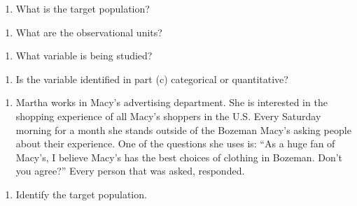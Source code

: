 \documentclass[
]{report}
\providecommand{\tightlist}{%
  \setlength{\itemsep}{0pt}\setlength{\parskip}{0pt}}
\begin{document}
\begin{enumerate}
\def\labelenumi{\alph{enumi}.}
\tightlist
\item
  What is the target population?
\end{enumerate}

\vspace{0.4in}

\begin{enumerate}
\def\labelenumi{\alph{enumi}.}
\setcounter{enumi}{1}
\tightlist
\item
  What are the observational units?
\end{enumerate}

\vspace{0.4in}

\begin{enumerate}
\def\labelenumi{\alph{enumi}.}
\setcounter{enumi}{2}
\tightlist
\item
  What variable is being studied?
\end{enumerate}

\vspace{0.4in}

\begin{enumerate}
\def\labelenumi{\alph{enumi}.}
\setcounter{enumi}{3}
\tightlist
\item
  Is the variable identified in part (c) categorical or quantitative?
\end{enumerate}

\vspace{0.4in}

\begin{enumerate}
\def\labelenumi{\arabic{enumi}.}
\setcounter{enumi}{1}
\tightlist
\item
  Martha works in Macy's advertising department. She is interested in the shopping experience of all Macy's shoppers in the U.S. Every Saturday morning for a month she stands outside of the Bozeman Macy's asking people about their experience. One of the questions she uses is: ``As a huge fan of Macy's, I believe Macy's has the best choices of clothing in Bozeman. Don't you agree?'' Every person that was asked, responded.
\end{enumerate}

\begin{enumerate}
\def\labelenumi{\alph{enumi}.}
\tightlist
\item
  Identify the target population.
\end{enumerate}

\vspace{0.4in}
\end{document}
